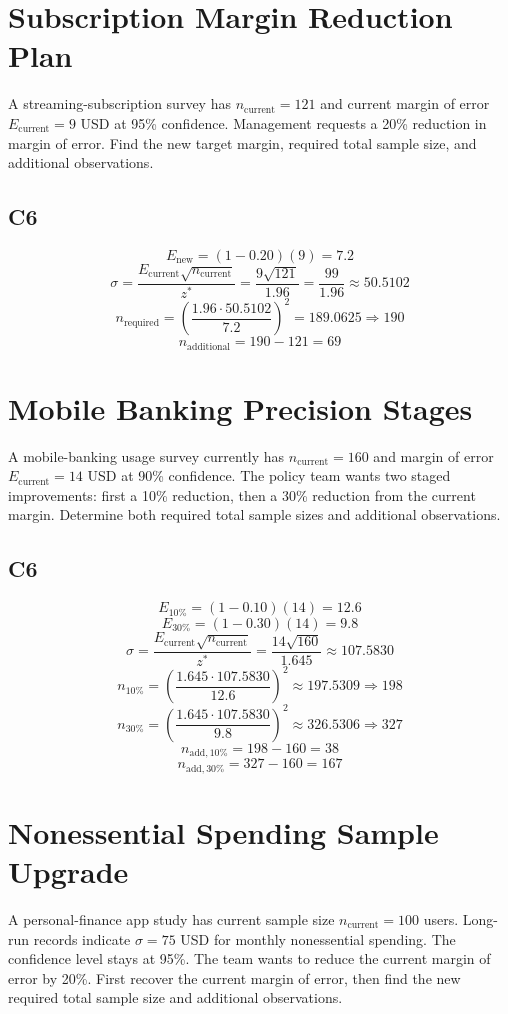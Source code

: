 \begin{ExamProblems}
		\item
		\section{Subscription Margin Reduction Plan}
		A streaming-subscription survey has $n_{\text{current}} = 121$ and current margin of error $E_{\text{current}} = 9$ USD at 95\% confidence. Management requests a 20\% reduction in margin of error. Find the new target margin, required total sample size, and additional observations.
		
		\subsection*{C6}
		\[
		E_{\text{new}} = (1-0.20)(9) = 7.2
		\]
		\[
		\sigma = \frac{E_{\text{current}}\sqrt{n_{\text{current}}}}{z^*}
		= \frac{9\sqrt{121}}{1.96}
		= \frac{99}{1.96}
		\approx 50.5102
		\]
		\[
		n_{\text{required}} = \left(\frac{1.96 \cdot 50.5102}{7.2}\right)^2
		= 189.0625
		\Rightarrow 190
		\]
		\[
		n_{\text{additional}} = 190 - 121 = 69
		\]
		
		\item
		\section{Mobile Banking Precision Stages}
		A mobile-banking usage survey currently has $n_{\text{current}} = 160$ and margin of error $E_{\text{current}} = 14$ USD at 90\% confidence. The policy team wants two staged improvements: first a 10\% reduction, then a 30\% reduction from the current margin. Determine both required total sample sizes and additional observations.
		
		\subsection*{C6}
		\[
		E_{10\%} = (1-0.10)(14) = 12.6
		\]
		\[
		E_{30\%} = (1-0.30)(14) = 9.8
		\]
		\[
		\sigma = \frac{E_{\text{current}}\sqrt{n_{\text{current}}}}{z^*}
		= \frac{14\sqrt{160}}{1.645}
		\approx 107.5830
		\]
		\[
		n_{10\%} = \left(\frac{1.645 \cdot 107.5830}{12.6}\right)^2
		\approx 197.5309 \Rightarrow 198
		\]
		\[
		n_{30\%} = \left(\frac{1.645 \cdot 107.5830}{9.8}\right)^2
		\approx 326.5306 \Rightarrow 327
		\]
		\[
		n_{\text{add},10\%} = 198 - 160 = 38
		\]
		\[
		n_{\text{add},30\%} = 327 - 160 = 167
		\]
		
		\item
		\section{Nonessential Spending Sample Upgrade}
		A personal-finance app study has current sample size $n_{\text{current}} = 100$ users. Long-run records indicate $\sigma = 75$ USD for monthly nonessential spending. The confidence level stays at 95\%. The team wants to reduce the current margin of error by 20\%. First recover the current margin of error, then find the new required total sample size and additional observations.
		

\end{ExamProblems}
